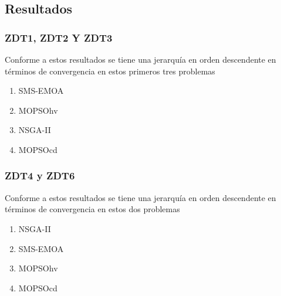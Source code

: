 \documentclass[10pt,compress]{beamer}
\begin{document}
\subsection{Resultados}
\begin{frame}
	\frametitle{ZDT1, ZDT2 Y ZDT3}	
	\begin{block}{Conforme a estos resultados se tiene una jerarqu\'ia en orden descendente en t\'erminos de convergencia en estos primeros tres 
  problemas}
\begin{enumerate}
  \item SMS-EMOA
  \item MOPSOhv
  \item NSGA-II
  \item MOPSOcd
\end{enumerate}
\end{block}
\end{frame}
\begin{frame}
	\frametitle{ZDT4 y ZDT6}	
	\begin{block}{Conforme a estos resultados se tiene una jerarqu\'ia en orden descendente en t\'erminos de convergencia en estos dos 
  problemas}
  
  \begin{enumerate}
  \item NSGA-II
  \item SMS-EMOA
  \item MOPSOhv
  \item MOPSOcd	
\end{enumerate}
\end{block}
\end{frame}
\end{document}
